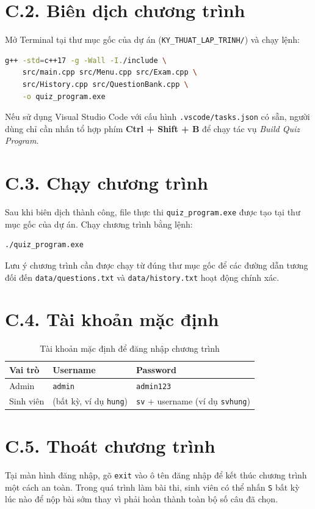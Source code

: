 \documentclass[11pt]{report}
\begin{document}
\section*{C.2. Biên dịch chương trình}

Mở Terminal tại thư mục gốc của dự án (\texttt{KY\_THUAT\_LAP\_TRINH/}) và chạy lệnh:

\begin{lstlisting}[language=bash, caption={Biên dịch thủ công bằng g++}]
g++ -std=c++17 -g -Wall -I./include \
    src/main.cpp src/Menu.cpp src/Exam.cpp \
    src/History.cpp src/QuestionBank.cpp \
    -o quiz_program.exe
\end{lstlisting}

Nếu sử dụng Visual Studio Code với cấu hình \texttt{.vscode/tasks.json} có sẵn, người dùng chỉ cần nhấn tổ hợp phím \textbf{Ctrl + Shift + B} để chạy tác vụ \textit{Build Quiz Program}.

\section*{C.3. Chạy chương trình}

Sau khi biên dịch thành công, file thực thi \texttt{quiz\_program.exe} được tạo tại thư mục gốc của dự án. Chạy chương trình bằng lệnh:

\begin{lstlisting}[language=bash, caption={Chạy chương trình}]
./quiz_program.exe
\end{lstlisting}

Lưu ý chương trình cần được chạy từ đúng thư mục gốc để các đường dẫn tương đối đến \texttt{data/questions.txt} và \texttt{data/history.txt} hoạt động chính xác.

\section*{C.4. Tài khoản mặc định}

\begin{table}[H]
    \centering
    \begin{tabularx}{\textwidth}{|l|l|X|} \hline
        \textbf{Vai trò} & \textbf{Username} & \textbf{Password} \\ \hline
        Admin & \texttt{admin} & \texttt{admin123} \\ \hline
        Sinh viên & (bất kỳ, ví dụ \texttt{hung}) & \texttt{sv} + username (ví dụ \texttt{svhung}) \\ \hline
    \end{tabularx}
    \caption{Tài khoản mặc định để đăng nhập chương trình}
\end{table}

\section*{C.5. Thoát chương trình}

Tại màn hình đăng nhập, gõ \texttt{exit} vào ô tên đăng nhập để kết thúc chương trình một cách an toàn. Trong quá trình làm bài thi, sinh viên có thể nhấn \texttt{S} bất kỳ lúc nào để nộp bài sớm thay vì phải hoàn thành toàn bộ số câu đã chọn.
\end{document}
